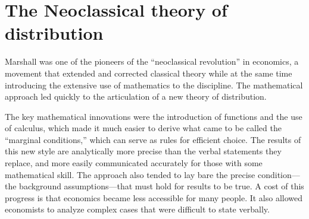 \section{The Neoclassical theory of distribution}
Marshall was one of the pioneers of the ``neoclassical revolution'' in economics, a movement that extended and corrected classical theory while at the same time introducing the extensive use of mathematics to the discipline. The mathematical approach led quickly to the articulation of a new theory of distribution.


The key mathematical innovations were the introduction of functions and the use of calculus, which  made it much easier to  derive what came to be called the ``marginal conditions,'' which can serve as rules for efficient choice. The results of this new style are analytically more precise than the verbal statements they replace, and more easily communicated accurately for those with some mathematical skill. The approach also tended to lay bare the precise condition---the background assumptions---that must hold for results to be true. A cost of this progress is that economics became less accessible for many people. It also allowed economists to analyze complex cases that were difficult to state verbally. 



